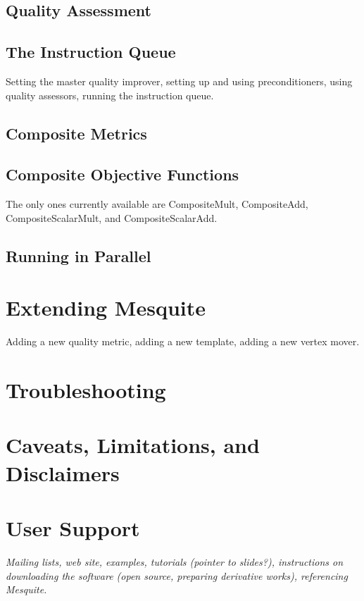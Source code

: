\documentclass[psfig]{article}
\begin{document}
\subsection{Quality Assessment}

\subsection{The Instruction Queue}
Setting the master quality improver, setting up and using preconditioners,
using quality assessors, running the instruction queue.

\subsection{Composite Metrics}

\subsection{Composite Objective Functions}
The only ones currently available are CompositeMult, CompositeAdd,
CompositeScalarMult, and CompositeScalarAdd.

\subsection{Running in Parallel}

\section{Extending Mesquite}
Adding a new quality metric, adding a new template, adding a new vertex 
mover.

\section{Troubleshooting}

\section{Caveats, Limitations, and Disclaimers}

\section{User Support}

{\it Mailing lists, web site, examples, tutorials (pointer to slides?), 
instructions on downloading the software (open source, preparing 
derivative works), referencing Mesquite.}
\end{document}
